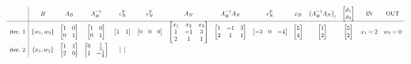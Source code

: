 \begin{equation*}
\scalemath{0.65}{
\begin{array}{ c|c c c c c c c c c c c c c }
 & B & A_{B} & A_{B}^{-1} & c_{B}^{T} & c_{N}^{T} & A_{N} & A_{B}^{-1} A_{N} & r_{N}^{T} & x_{B} & \left( A_{B}^{-1} A_{N}\right)_{i} & \begin{bmatrix}
\vartheta _{1}\\
\vartheta _{2}
\end{bmatrix} & \text{IN} & \text{OUT}\\
\hline
\text{iter.} \ 1 & \{w_{1} ,w_{2}\} & \begin{bmatrix}
1 & 0\\
0 & 1
\end{bmatrix} & \begin{bmatrix}
1 & 0\\
0 & 1
\end{bmatrix} & \begin{bmatrix}
1 & 1
\end{bmatrix} & \begin{bmatrix}
0 & 0 & 0
\end{bmatrix} & \begin{bmatrix}
x_{1} & x_{2} & x_{3}\\
1 & -1 & 3\\
2 & 1 & 1
\end{bmatrix} & \begin{bmatrix}
1 & -1 & 3\\
2 & 1 & 1
\end{bmatrix} & \begin{bmatrix}
-3 & 0 & -4
\end{bmatrix} & \begin{bmatrix}
5\\
4
\end{bmatrix} & \begin{bmatrix}
1\\
2
\end{bmatrix} & \begin{bmatrix}
5\\
2
\end{bmatrix} & x_{1} =2 & w_{2} =0\\
\text{iter.} \ 2 & \{x_{1} ,w_{1}\} & \begin{bmatrix}
1 & 1\\
2 & 0
\end{bmatrix} & \begin{bmatrix}
0 & \frac{1}{2}\\
1 & -\frac{1}{2}
\end{bmatrix} & \begin{bmatrix}

\end{bmatrix}
\end{array}}
\end{equation*}
